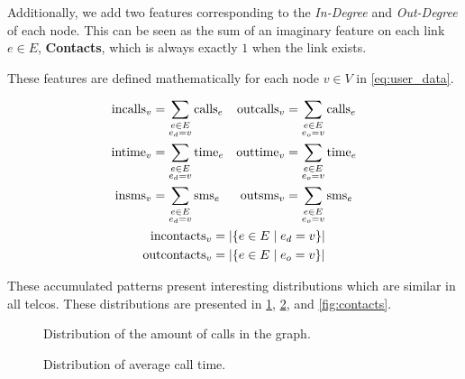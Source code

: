 Additionally, we add two features corresponding to the \emph{In-Degree} and \emph{Out-Degree} of each node. This can be seen as the sum of an imaginary feature on each link $e \in E$, \textbf{Contacts}, which is always exactly $1$ when the link exists.

These features are defined mathematically for each node $v \in V$ in \cref{eq:user_data}.

\begin{equation}
\begin{gathered}
\begin{aligned}
\operatorname{incalls}_v &= \sum_{\substack{e \in E \\ e_d = v}} \operatorname{calls}_e &
\operatorname{outcalls}_v &= \sum_{\substack{e \in E \\ e_o = v}} \operatorname{calls}_e \\
\operatorname{intime}_v &= \sum_{\substack{e \in E \\ e_d = v}} \operatorname{time}_e &
\operatorname{outtime}_v &= \sum_{\substack{e \in E \\ e_o = v}} \operatorname{time}_e \\
\operatorname{insms}_v &= \sum_{\substack{e \in E \\ e_d = v}} \operatorname{sms}_e &
\operatorname{outsms}_v &= \sum_{\substack{e \in E \\ e_o = v}} \operatorname{sms}_e \\
\end{aligned} \\
\begin{aligned}
\operatorname{incontacts}_v &= \left| \left\{ e \in E \mid e_d = v \right\} \right| \\
\operatorname{outcontacts}_v &= \left| \left\{ e \in E \mid e_o = v \right\} \right|
\end{aligned}
\end{gathered}
\label{eq:user_data}
\end{equation}

These accumulated patterns present interesting distributions which are similar in all telcos. These distributions are presented in \cref{fig:callsms}, \cref{fig:time}, and \cref{fig:contacts}.

\begin{figure}
\caption{Distribution of the amount of calls in the graph.}
\label{fig:callsms}
\end{figure}

\begin{figure}
\caption{Distribution of average call time.}
\label{fig:time}
\end{figure}

